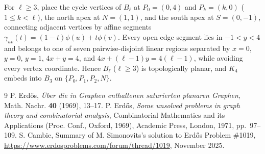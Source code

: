 \documentclass[11pt]{amsart}
\begin{document}
For $\ell \ge 3$, place the cycle vertices of $B_\ell$ at $P_0 = (0,4)$ and $P_k = (k,0)$ ($1 \le k < \ell$), the north apex at $N = (1,1)$, and the south apex at $S = (0,-1)$, connecting adjacent vertices by affine segments $\gamma_{uv}(t) = (1-t)\phi(u) + t\phi(v)$. Every open edge segment lies in $-1 < y < 4$ and belongs to one of seven pairwise-disjoint linear regions separated by $x = 0$, $y = 0$, $y = 1$, $4x + y = 4$, and $4x + (\ell - 1)y = 4(\ell - 1)$, while avoiding every vertex coordinate. Hence $B_\ell$ ($\ell \ge 3$) is topologically planar, and $K_4$ embeds into $B_3$ on $\{P_0, P_1, P_2, N\}$.

\begin{thebibliography}{9}
 P. Erd\H{o}s, \emph{\"Uber die in Graphen enthaltenen saturierten planaren Graphen}, Math. Nachr. \textbf{40} (1969), 13--17.
 P. Erd\H{o}s, \emph{Some unsolved problems in graph theory and combinatorial analysis}, Combinatorial Mathematics and its Applications (Proc. Conf., Oxford, 1969), Academic Press, London, 1971, pp.~97--109.
 S. Cambie, Summary of M. Simonovits's solution to Erd\H{o}s Problem \#1019, \url{https://www.erdosproblems.com/forum/thread/1019}, November 2025.
\end{thebibliography}
\end{document}
